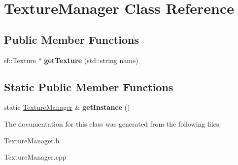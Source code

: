 \hypertarget{class_texture_manager}{\section{Texture\-Manager Class Reference}
\label{class_texture_manager}
}
\subsection*{Public Member Functions}
\begin{DoxyCompactItemize}
\item 
\hypertarget{class_texture_manager_a014fb7d59012f507cefc88cbc9ad05bc}{sf\-::\-Texture $\ast$ {\bfseries get\-Texture} (std\-::string name)}\label{class_texture_manager_a014fb7d59012f507cefc88cbc9ad05bc}

\end{DoxyCompactItemize}
\subsection*{Static Public Member Functions}
\begin{DoxyCompactItemize}
\item 
\hypertarget{class_texture_manager_a0a6bc63e2f6fa7e1d0aee5b24cfa089a}{static \hyperlink{class_texture_manager}{Texture\-Manager} \& {\bfseries get\-Instance} ()}\label{class_texture_manager_a0a6bc63e2f6fa7e1d0aee5b24cfa089a}

\end{DoxyCompactItemize}


The documentation for this class was generated from the following files\-:\begin{DoxyCompactItemize}
\item 
Texture\-Manager.\-h\item 
Texture\-Manager.\-cpp\end{DoxyCompactItemize}
